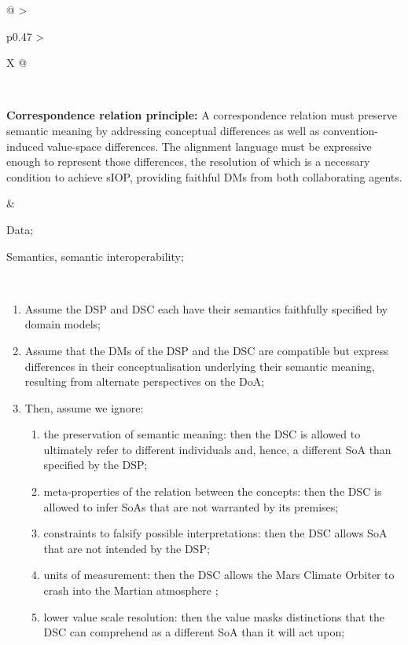 \begin{xltabular}[l]{\linewidth}{@{} >{\small\raggedright\arraybackslash}p{0.47\linewidth} >{\small\raggedright\arraybackslash}X @{}}
\begin{enumerate}[left=10pt, nosep]
\end{enumerate} \\
%
%
%
\begin{mmdp}\label{dp:crp}{\bfseries Correspondence relation principle:}
\quad A correspondence relation must preserve semantic meaning by addressing conceptual differences as well as convention-induced value-space differences. The alignment language must be expressive enough to represent those differences, the resolution of which is a necessary condition to achieve sIOP, providing faithful DMs from both collaborating agents. \end{mmdp}
&
\begin{description}[labelwidth=3.7cm,leftmargin=3.7cm+1ex,nosep,topsep=2ex,labelsep=1ex,font=\bfseries]
  \item[Type of information:] Data;
  \item[Quality attributes:] Semantics, semantic interoperability;
\end{description}\\
\begin{enumerate}[left=6pt, nosep]
  \item Assume the DSP and DSC each have their semantics faithfully specified by domain models;
  \item Assume that the DMs of the DSP and the DSC are compatible but express differences in their conceptualisation underlying their semantic meaning, resulting from alternate perspectives on the DoA;
  \item Then, assume we ignore:
  \begin{enumerate}
    \item the preservation of semantic meaning: then the DSC is allowed to ultimately refer to different individuals and, hence, a different SoA than specified by the DSP; 
    \item meta-properties of the relation between the concepts: then the DSC is allowed to infer SoAs that are not warranted by its premises;
    \item constraints to falsify possible interpretations: then the DSC allows SoA that are not intended by the DSP; 
    \item units of measurement: then the DSC allows the Mars Climate Orbiter to crash into the Martian atmosphere \cite{Leveson2004};
    \item lower value scale resolution: then the value masks distinctions that the DSC can comprehend as a different SoA than it will act upon;

\end{enumerate}
\end{enumerate}
\end{xltabular}

